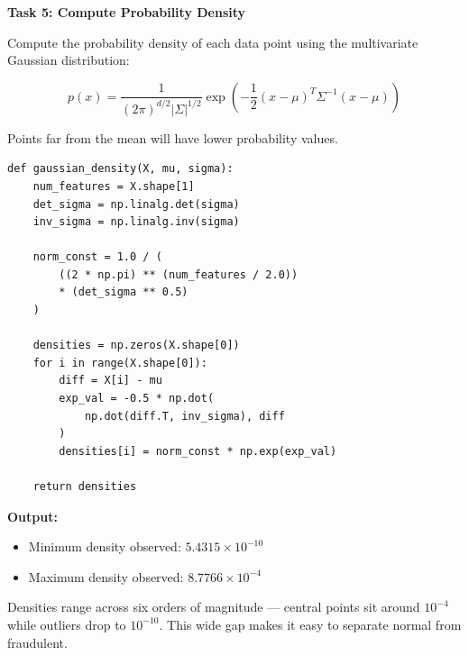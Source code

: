 \documentclass[12pt,a4paper]{article}
\begin{document}
\begin{tcolorbox}
\textbf{Task 5: Compute Probability Density}

Compute the probability density of each data point using the multivariate 
Gaussian distribution:

\[
p(x) = \frac{1}{(2\pi)^{d/2} |\Sigma|^{1/2}} 
\exp\left(-\frac{1}{2}(x-\mu)^T \Sigma^{-1} (x-\mu)\right)
\]

Points far from the mean will have lower probability values.

\begin{lstlisting}
def gaussian_density(X, mu, sigma):
    num_features = X.shape[1]
    det_sigma = np.linalg.det(sigma)
    inv_sigma = np.linalg.inv(sigma)
    
    norm_const = 1.0 / (
        ((2 * np.pi) ** (num_features / 2.0))
        * (det_sigma ** 0.5)
    )
    
    densities = np.zeros(X.shape[0])
    for i in range(X.shape[0]):
        diff = X[i] - mu
        exp_val = -0.5 * np.dot(
            np.dot(diff.T, inv_sigma), diff
        )
        densities[i] = norm_const * np.exp(exp_val)
        
    return densities
\end{lstlisting}

\textbf{Output:}
\begin{itemize}
\item Minimum density observed: $5.4315 \times 10^{-10}$
\item Maximum density observed: $8.7766 \times 10^{-4}$
\end{itemize}

Densities range across six orders of magnitude --- central points sit around $10^{-4}$ while outliers drop to $10^{-10}$. This wide gap makes it easy to separate normal from fraudulent.

\end{tcolorbox}

\vspace{14pt}
\end{document}
